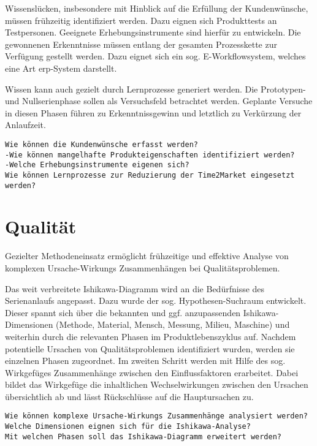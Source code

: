 Wissenslücken, insbesondere mit Hinblick auf die Erfüllung der Kundenwünsche, müssen frühzeitig identifiziert werden. Dazu eignen sich Produkttests an Testpersonen. Geeignete Erhebungsinstrumente sind hierfür zu entwickeln. Die gewonnenen Erkenntnisse müssen entlang der gesamten Prozesskette zur Verfügung gestellt werden. Dazu eignet sich ein sog. E-Workflowsystem, welches eine Art \gls{erp}-System darstellt. 

Wissen kann auch gezielt durch Lernprozesse generiert werden. Die Prototypen- und Nullserienphase sollen als Versuchsfeld betrachtet werden. Geplante Versuche in diesen Phasen führen zu Erkenntnissgewinn und letztlich zu Verkürzung der Anlaufzeit. 

\begin{verbatim}
Wie können die Kundenwünsche erfasst werden? 
-Wie können mangelhafte Produkteigenschaften identifiziert werden? 
-Welche Erhebungsinstrumente eigenen sich?
Wie können Lernprozesse zur Reduzierung der Time2Market eingesetzt werden? 
\end{verbatim}

\section{Qualität}

Gezielter Methodeneinsatz ermöglicht frühzeitige und effektive Analyse von komplexen Ursache-Wirkungs %
Zusammenhängen bei Qualitätsproblemen. 

Das weit verbreitete Ishikawa-Diagramm wird an die Bedürfnisse des Serienanlaufs angepasst. Dazu wurde der sog. Hypothesen-Suchraum entwickelt. Dieser spannt sich über die bekannten und ggf. anzupassenden Ishikawa-Dimensionen (Methode, Material, Mensch, Messung, Milieu, Maschine) und weiterhin durch die relevanten Phasen im Produktlebenszyklus auf. Nachdem potentielle Ursachen  von Qualitätsproblemen identifiziert wurden, werden sie einzelnen Phasen zugeordnet. Im zweiten Schritt werden mit Hilfe des sog. Wirkgefüges Zusammenhänge zwischen den Einflussfaktoren erarbeitet. Dabei bildet das Wirkgefüge die inhaltlichen Wechselwirkungen zwischen den Ursachen übersichtlich ab und lässt Rückschlüsse auf die Hauptursachen zu.

\begin{verbatim}
Wie können komplexe Ursache-Wirkungs Zusammenhänge analysiert werden? 
Welche Dimensionen eignen sich für die Ishikawa-Analyse? 
Mit welchen Phasen soll das Ishikawa-Diagramm erweitert werden?
\end{verbatim}

